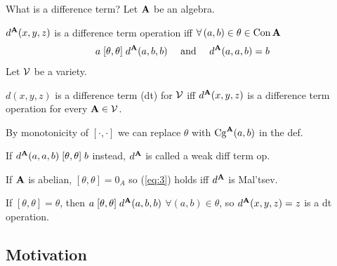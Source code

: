 \documentclass[notes=hide,12pt,xcolor=dvipsnames%
   ]{beamer}
\renewcommand{\defn}[1]{\alert{#1}}
\theoremstyle{definition}
\begin{document}
\begin{frame}[shrink=2,label=diff]{What is a difference term?}
  Let $\mathbf{A}$ be an algebra.

  $d^{\mathbf{A}}(x,y,z)$ is a \alert{difference term operation} iff 
  $\forall\, (a,b) \in \theta \in \operatorname{Con} \mathbf{A}$
  \begin{equation}
    \label{eq:3}  
    a \mathrel{[\theta, \theta]} d^{\mathbf{A}}(a,b,b) 
    \quad \text{ and } \quad
    d^{\mathbf{A}}(a,a,b) = b 
  \end{equation}
  \pause
  Let $\mathcal{V}$ be a variety. %

  $d(x,y,z)$ is a \alert{difference term} (dt) for $\mathcal{V}$ iff
  $d^{\mathbf{A}}(x,y,z)$ is a difference term operation for every $\mathbf{A} \in \mathcal{V}$.

  \pause
  By monotonicity of $[\cdot, \cdot]$ we can replace $\theta$ 
  with $\operatorname{Cg}^{\mathbf{A}}(a,b)$ in the def.

  \pause 
  If $d^{\mathbf{A}}(a,a,b) \mathrel{[\theta, \theta]} b$ instead, $d^{\mathbf{A}}$ is called a \alert{weak diff term op}.

  \pause
  If $\mathbf{A}$ is \alert{abelian},
  $[\theta, \theta] = 0_A$ so
  (\ref{eq:3}) holds iff $d^{\mathbf{A}}$ is Mal'tsev.

  \pause
  If $[\theta, \theta] = \theta$,  then
  $a \mathrel{[\theta, \theta]} d^{\mathbf{A}}(a,b,b)$ $\forall (a, b) \in \theta$, so
  $d^{\mathbf{A}}(x,y,z) = z$ is a dt operation.
\end{frame}



\subsection{Motivation}
\end{document}
